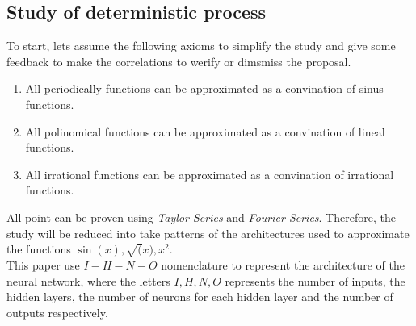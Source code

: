 \documentclass[a4paper, 11pt]{article}
\begin{document}
\newpage
\subsection{Study of deterministic process}
To start, lets assume the following axioms to simplify the study and give some feedback to make the correlations to werify or dimsmiss the proposal.
\begin{enumerate}
    \item All periodically functions can be approximated as a convination of sinus functions.
    \item All polinomical functions can be approximated as a convination of lineal functions.
    \item All irrational functions can be approximated as a convination of irrational functions.
\end{enumerate}
All point can be proven using \textit{Taylor Series} and \textit{Fourier Series}.
Therefore, the study will be reduced into take patterns of the architectures used to approximate the functions $\sin(x), \sqrt(x), x^2$.\\
This paper use $I-H-N-O$ nomenclature to represent the architecture of the neural network, where the letters $I,H,N,O$ represents the number of inputs, the hidden layers, the number of neurons for each hidden layer and the number of outputs respectively.
\end{document}
